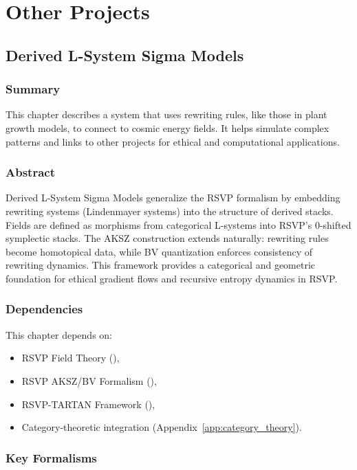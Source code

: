 \documentclass[11pt,oneside]{memoir}
\theoremstyle{plain}
\begin{document}
\part{Other Projects}
\chapter{Derived L-System Sigma Models}
\label{sec:l_system_sigma}

\section{Summary}
This chapter describes a system that uses rewriting rules, like those in plant growth models, to connect to cosmic energy fields. It helps simulate complex patterns and links to other projects for ethical and computational applications.

\section{Abstract}
Derived L-System Sigma Models generalize the RSVP formalism by embedding rewriting systems (Lindenmayer systems) into the structure of derived stacks. Fields are defined as morphisms from categorical L-systems into RSVP’s 0-shifted symplectic stacks. The AKSZ construction extends naturally: rewriting rules become homotopical data, while BV quantization enforces consistency of rewriting dynamics. This framework provides a categorical and geometric foundation for ethical gradient flows and recursive entropy dynamics in RSVP.

\section{Dependencies}
This chapter depends on:
\begin{itemize}
    \item RSVP Field Theory (),
    \item RSVP AKSZ/BV Formalism (),
    \item RSVP-TARTAN Framework (),
    \item Category-theoretic integration (Appendix~\ref{app:category_theory}).
\end{itemize}

\section{Key Formalisms}
\end{document}
